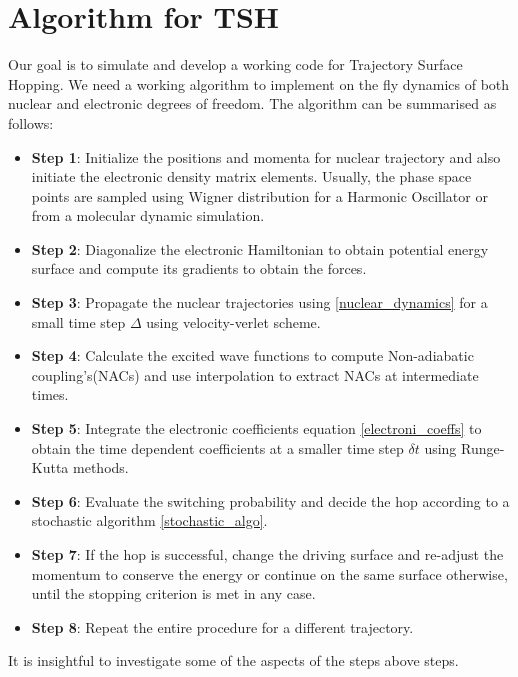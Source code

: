 \section{Algorithm for TSH}
    Our goal is to simulate and develop a working code for Trajectory Surface Hopping. We need a working algorithm to implement on the fly dynamics of both nuclear and electronic degrees of freedom. The algorithm can be summarised as follows:  

    \begin{itemize}
        \item[]\textbf{Step 1}: Initialize the positions and momenta for nuclear trajectory and also initiate the electronic density matrix elements. Usually, the phase space points are sampled using Wigner distribution for a Harmonic Oscillator or from a molecular dynamic simulation.  
        \item[]\textbf{Step 2}: Diagonalize the electronic Hamiltonian to obtain potential energy surface and compute its gradients to obtain the forces. 
        \item[]\textbf{Step 3}: Propagate the nuclear trajectories using \eqref{nuclear_dynamics} for a small time step $\Delta$ using velocity-verlet scheme. 
        \item[]\textbf{Step 4}: Calculate the excited wave functions to compute Non-adiabatic coupling's(NACs) and use interpolation to extract NACs at intermediate times.
        \item[]\textbf{Step 5}: Integrate the electronic coefficients equation \eqref{electroni_coeffs} to obtain the time dependent coefficients at a smaller time step $\delta t$ using Runge-Kutta methods. 
        \item[]\textbf{Step 6}: Evaluate the switching probability and decide the hop according to a stochastic algorithm \eqref{stochastic_algo}. 
        \item[]\textbf{Step 7}: If the hop is successful, change the driving surface and re-adjust the momentum to conserve the energy or continue on the same surface otherwise, until the stopping criterion is met in any case.  
        \item[]\textbf{Step 8}: Repeat the entire procedure for a different trajectory. 
    \end{itemize}
    It is insightful to investigate some of the aspects of the steps above steps. 
